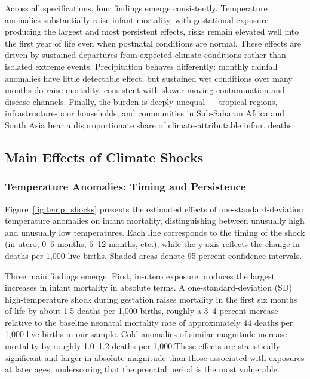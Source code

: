 \documentclass[a4paper]{article}
\begin{document}
Across all specifications, four findings emerge consistently. Temperature anomalies substantially raise infant mortality, with gestational exposure producing the largest and most persistent effects, risks remain elevated well into the first year of life even when postnatal conditions are normal. These effects are driven 
by sustained departures from expected climate conditions rather than isolated extreme events. Precipitation behaves differently: monthly rainfall anomalies have little detectable effect, but sustained wet conditions over many months do raise mortality, consistent with slower-moving contamination and disease channels. Finally, the burden 
is deeply unequal — tropical regions, infrastructure-poor households, and communities in Sub-Saharan Africa and South Asia bear a disproportionate share of climate-attributable infant deaths.

\subsection{Main Effects of Climate Shocks} \label{sec:results_main}

\subsubsection{Temperature Anomalies: Timing and Persistence}

Figure~\ref{fig:temp_shocks} presents the estimated effects of one-standard-deviation temperature anomalies on infant mortality, distinguishing between unusually high and unusually low temperatures. Each line corresponds to the timing of the shock (in utero, 0--6 months, 6--12 months, etc.), while the y-axis reflects the change in deaths per 1,000 live births. Shaded areas denote 95 percent confidence intervals.

Three main findings emerge. First, in-utero exposure produces the largest increases in infant mortality in absolute terms. A one-standard-deviation (SD) high-temperature shock during gestation raises mortality in the first six months of life by about 1.5 deaths per 1,000 births, roughly a 3--4 percent increase relative to the 
baseline neonatal mortality rate of approximately 44 deaths per 1,000 live births in our sample. Cold anomalies of similar magnitude increase mortality by roughly 1.0--1.2 deaths per 1,000.These effects are statistically significant and larger in absolute magnitude than those associated with exposures at later ages, underscoring that the prenatal period is the most vulnerable. 
\end{document}
